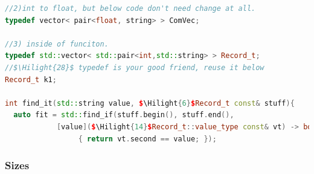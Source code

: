 \documentclass[a4paper,12pt,twoside]{book}
\newcommand{\Hilight}[1]{\makebox[0pt][l]{\color{yellow}\rule[-3pt]{#1em}{11pt}}}
\begin{document}
\begin{itemize}
\begin{lstlisting}[frame=single, language=c++, mathescape=true]
//2)int to float, but below code don't need change at all.
typedef vector< pair<float, string> > ComVec;

//3) inside of funciton.
typedef std::vector< std::pair<int,std::string> > Record_t;
//$\Hilight{28}$ typedef is your good friend, reuse it below
Record_t k1;

int find_it(std::string value, $\Hilight{6}$Record_t const& stuff){
  auto fit = std::find_if(stuff.begin(), stuff.end(),
            [value]($\Hilight{14}$Record_t::value_type const& vt) -> bool
                 { return vt.second == value; });
\end{lstlisting}

\end{itemize}


\subsubsection{Sizes}
\end{document}
